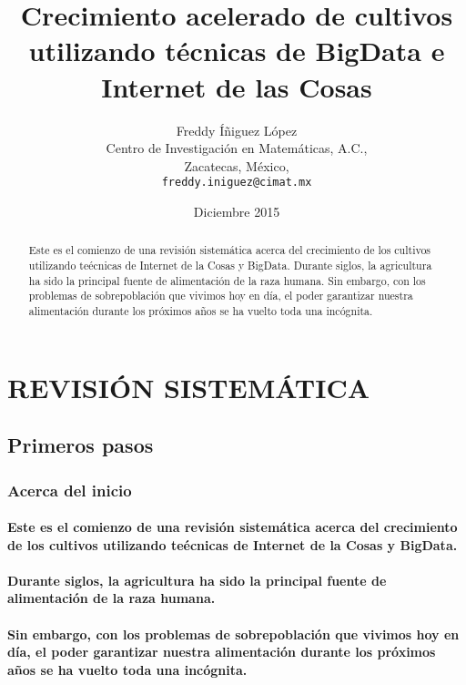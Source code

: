 \documentclass[11pt, twocolumn]{article}
\begin{document}
\title{Crecimiento acelerado de cultivos utilizando técnicas de BigData e Internet de las Cosas}
\author{Freddy Íñiguez López\\
	Centro de Investigación en Matemáticas, A.C.,\\
	Zacatecas, México,\\
	\texttt{freddy.iniguez@cimat.mx}}
\date{Diciembre 2015}
\maketitle

\begin{abstract}
Este es el comienzo de una revisión sistemática acerca del crecimiento de los cultivos utilizando teécnicas de Internet de la Cosas y BigData.
Durante siglos, la agricultura ha sido la principal fuente de alimentación de la raza humana.
Sin embargo, con los problemas de sobrepoblación que vivimos hoy en día, el poder garantizar nuestra alimentación durante los próximos años se ha vuelto toda una incógnita.
\end{abstract}

\section{REVISIÓN SISTEMÁTICA}
\subsection{Primeros pasos}
\subsubsection{Acerca del inicio}

\paragraph{Este es el comienzo de una revisión sistemática acerca del crecimiento de los cultivos utilizando teécnicas de Internet de la Cosas y BigData.}

\paragraph{Durante siglos, la agricultura ha sido la principal fuente de alimentación de la raza humana.}

\paragraph{Sin embargo, con los problemas de sobrepoblación que vivimos hoy en día, el poder garantizar nuestra alimentación durante los próximos años se ha vuelto toda una incógnita.}
\end{document}
